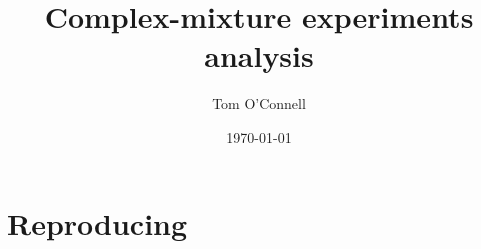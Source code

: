 \documentclass{article}
\begin{document}
\title{Complex-mixture experiments analysis}
\author{Tom O'Connell}
\date{\today}
\maketitle


\tableofcontents

\pagebreak

\section{Reproducing}
\end{document}
